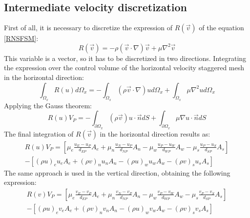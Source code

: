 \subsection{Intermediate velocity discretization}
First of all, it is necessary to discretize the expression of $R\left(\vec{v}\right)$ of the equation \ref{RNSFSM}:
\begin{equation}
R\left(\vec{v}\right)=-\rho\left(\vec{v}\cdot\nabla\right)\vec{v}+\mu\nabla^{2}\vec{v}
\end{equation}
This variable is a vector, so it has to be discretized in two directions. Integrating the expression over the control volume of the horizontal velocity staggered mesh in the horizontal direction:
\begin{equation}
\int_{\Omega_{x}}R\left(u\right)d\Omega_{x}=-\int_{\Omega_{x}}\left(\rho\vec{v}\cdot\nabla\right)ud\Omega_{x}+\int_{\Omega_{x}}\mu\nabla^{2}ud\Omega_{x}
\end{equation}
Applying the Gauss theorem:
\begin{equation}
R\left(u\right)V_{P}=-\int_{\partial\Omega_{x}}\left(\rho\vec{v}\right)u\cdot\vec{n}dS+\int_{\partial\Omega_{x}}\mu\nabla u\cdot\vec{n}dS
\end{equation}
The final integration of $R\left(\vec{v}\right)$ in the horizontal direction results as:
\begin{multline}
R\left(u\right)V_{P}=\left[\mu_{e}\frac{u_{E}-u_{P}}{d_{EP}}A_{e}+\mu_{n}\frac{u_{N}-u_{P}}{d_{NP}}A_{n}-\mu_{w}\frac{u_{P}-u_{W}}{d_{WP}}A_{w}-\mu_{s}\frac{u_{P}-u_{S}}{d_{SP}}A_{s}\right] \\
-\left[\left(\rho u\right)_{e}u_{e}A_{e}+\left(\rho v\right)_{n}u_{n}A_{n}-\left(\rho u\right)_{w}u_{w}A_{w}-\left(\rho v\right)_{s}u_{s}A_{s}\right]
\end{multline}
The same approach is used in the vertical direction, obtaining the following expression:
\begin{multline}
	R\left(v\right)V_{P}=\left[\mu_{e}\frac{v_{E}-v_{P}}{d_{EP}}A_{e}+\mu_{n}\frac{v_{N}-v_{P}}{d_{NP}}A_{n}-\mu_{w}\frac{v_{P}-v_{W}}{d_{WP}}A_{w}-\mu_{s}\frac{v_{P}-v_{S}}{d_{SP}}A_{s}\right] \\
	-\left[\left(\rho u\right)_{e}v_{e}A_{e}+\left(\rho v\right)_{n}v_{n}A_{n}-\left(\rho u\right)_{w}v_{w}A_{w}-\left(\rho v\right)_{s}v_{s}A_{s}\right]
\end{multline}

